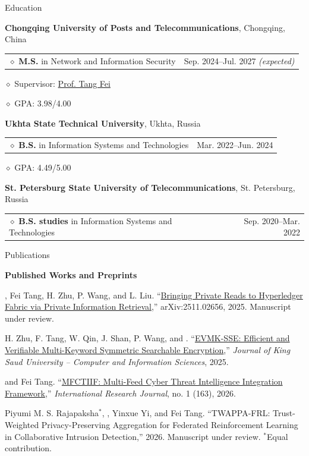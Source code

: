 \documentclass[11pt,a4paper]{article}
\makeatletter
\newcommand{\cvrow}[2]{%
  \noindent
  \begin{minipage}[t]{0.145\textwidth}
    \vspace{0pt}%
    \raggedright
    \fontsize{10.5}{12.5}\selectfont
    #1
  \end{minipage}%
  \hfill
  \begin{minipage}[t]{0.835\textwidth}
    \vspace{0pt}%
    #2
  \end{minipage}\par
}
\newcommand{\pub}[2]{%
  #1 #2\par
  \vspace{0.28em}
}
\newcommand{\eduentry}[2]{%
  \noindent
  \begin{tabularx}{\linewidth}
    {@{}X@{\hspace{0.8em}}r@{}}
    #1 & \small #2
  \end{tabularx}\par
  \vspace{0.15em}
}
\newcommand{\edudetail}[1]{%
  \noindent\hspace*{1.15em}$\diamond$ #1\par
}
\makeatother
\begin{document}
\vspace{0.75em}

\cvrow{Education}{%
  \raggedright

  \textbf{Chongqing University of Posts and Telecommunications},
  Chongqing, China\par
  \vspace{0.12em}

  \eduentry
    {$\diamond$ \textbf{M.S.} in Network and Information Security}
    {Sep. 2024--Jul. 2027 \textit{(expected)}}

  \edudetail{Supervisor:
    \href{https://faculty.cqupt.edu.cn/tangfei/en/index.htm}{Prof. Tang Fei}}
  \edudetail{GPA: 3.98/4.00}

  \vspace{0.48em}

  \textbf{Ukhta State Technical University},
  Ukhta, Russia\par
  \vspace{0.12em}

  \eduentry
    {$\diamond$ \textbf{B.S.} in Information Systems and Technologies}
    {Mar. 2022--Jun. 2024}

  \edudetail{GPA: 4.49/5.00}

  \vspace{0.48em}

  \textbf{St. Petersburg State University of Telecommunications},
  St. Petersburg, Russia\par
  \vspace{0.12em}

  \eduentry
    {$\diamond$ \textbf{B.S. studies} in Information Systems and Technologies}
    {Sep. 2020--Mar. 2022}
}

\vspace{0.75em}

\cvrow{Publications}{%
  \textbf{Published Works and Preprints}\par\vspace{0.25em}

  \pub{\underbar{Artur Iasenovets}, Fei Tang, H. Zhu, P. Wang, and L. Liu.}
  {``\href{https://arxiv.org/abs/2511.02656}
  {Bringing Private Reads to Hyperledger Fabric via Private Information Retrieval},''
  arXiv:2511.02656, 2025. Manuscript under review.}

  \pub{H. Zhu, F. Tang, W. Qin, J. Shan, P. Wang, and \underbar{Artur Iasenovets}.}
  {``\href{https://doi.org/10.1007/s44443-025-00405-8}
  {EVMK-SSE: Efficient and Verifiable Multi-Keyword Symmetric Searchable Encryption},''
  \textit{Journal of King Saud University -- Computer and Information Sciences}, 2025.}

  \pub{\underbar{Artur Iasenovets} and Fei Tang.}
  {``\href{https://doi.org/10.60797/IRJ.2026.163.57}
  {MFCTIIF: Multi-Feed Cyber Threat Intelligence Integration Framework},''
  \textit{International Research Journal}, no. 1 (163), 2026.}

  \pub{Piyumi M. S. Rajapaksha$^{*}$, \underbar{Artur Iasenovets$^{*}$},
  Yinxue Yi, and Fei Tang.}
  {``TWAPPA-FRL: Trust-Weighted Privacy-Preserving Aggregation for Federated
  Reinforcement Learning in Collaborative Intrusion Detection,''
  2026. Manuscript under review. $^{*}$Equal contribution.}
}
\end{document}
